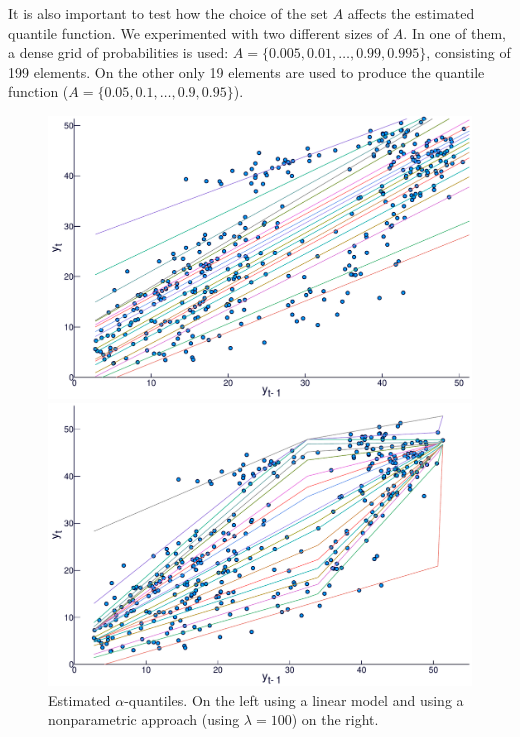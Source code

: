 It is also important to test how the choice of the set $A$ affects the estimated quantile function. We experimented with two different sizes of $A$. In one of them, a dense grid of probabilities is used:   $A=\{0.005, 0.01, \dots, 0.99, 0.995 \}$, consisting of 199 elements. On the other only 19 elements are used to produce the quantile function ($A=\{0.05, 0.1, \dots, 0.9, 0.95 \}$).

\begin{figure}
  \centering
  \begin{minipage}[t]{\linewidth}
    \centering
    \begin{minipage}[t]{0.45\linewidth}
      \centering     \includegraphics[width=\textwidth]{Figuras/regressao-quantilica/icaraizinho-quantile-linear-scatter}
    \end{minipage}
    \begin{minipage}[t]{0.45\linewidth}
      \centering     \includegraphics[width=\textwidth]{Figuras/regressao-quantilica/icaraizinho-quantile-nonpar-scatter-lambda30}
    \end{minipage}
  \end{minipage}
  \caption{Estimated $\alpha$-quantiles. On the left using a linear model and using a nonparametric approach (using $\lambda = 100$) on the right.}
  \label{fig:scatterplot-alphaquantiles}
\end{figure}




